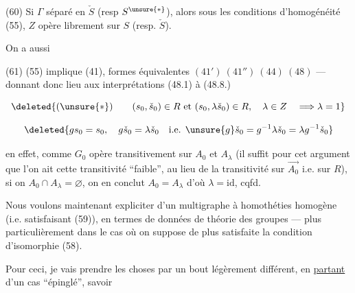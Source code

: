 (60) Si $\Gamma$ séparé en $\check S$ (resp $S^{\unsure{*}}$), alors sous les conditions d'homogénéité (55), $Z$ opère librement sur $S$ (resp. $\check S$).

On a aussi

(61) (55) implique (41),   formes équivalentes $(41')\ (41'')\ (44)\ (48)$ --- donnant donc lieu aux interprétations (48.1) à (48.8.)

\[
\deleted{(\unsure{*})\qquad (s_0,\check s_0)\in R\text{ et }(s_0,\lambda\check s_0)\in R,\quad\lambda\in Z\quad\Longrightarrow\lambda=1}
\]

\[
\deleted{gs_0=s_0,\quad g\check s_0=\lambda\check s_0\quad\text{i.e. }\unsure{g}\check s_{0}=g^{-1}\lambda\check s_0=\lambda g^{-1}\check s_0}
\]

en effet, comme $G_0$ opère transitivement sur $A_0$ et $A_\lambda$ (il suffit  pour cet argument que l'on ait cette transitivité \textquotedblleft{}faible\textquotedblright, au lieu de la transitivité sur $\overrightarrow{A_0}$  i.e. sur $R$), si on  $A_0\cap A_\lambda=\varnothing$, on en conclut $A_0=A_\lambda$ d'où $\lambda=\mathrm{id}$, cqfd.

Nous voulons maintenant expliciter     d'un  multigraphe à homothéties homogène (i.e. satisfaisant (59)), en termes de données de théorie des groupes --- plus particulièrement dans le cas où on suppose de plus satisfaite la condition d'isomorphie (58).

Pour ceci,  je vais prendre les choses par un bout légèrement différent, en  \uline{partant} d'un cas \textquotedblleft{}épinglé\textquotedblright,  savoir

